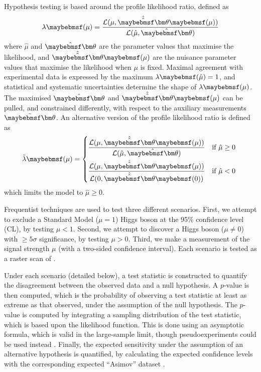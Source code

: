 Hypothesis testing is based around the profile likelihood ratio, defined as
\begin{equation}
	\lambda\parenths{\mu} = \frac{\mathcal{L}(\mu, \hat{\hat{\bvec{\theta}}}\parenths{\mu})}{\mathcal{L}(\hat{\mu}, \hat{\bvec{\theta}})}
\end{equation}
where $\hat{\mu}$ and $\hat{\bvec{\theta}}$ are the parameter values that maximise the 
likelihood, and $\hat{\hat{\bvec{\theta}}}\parenths{\mu}$ are the nuisance parameter values 
that maximise the likelihood when $\mu$ is fixed. Maximal agreement with experimental data 
is expressed by the maximum $\lambda\parenths{\hat{\mu}} = 1$, and statistical and 
systematic uncertainties determine the shape of $\lambda\parenths{\mu}$. The maximised 
$\hat{\bvec{\theta}}$ and $\hat{\hat{\bvec{\theta}}}\parenths{\mu}$ can be pulled, and 
constrained differently, with respect to the auxiliary measurements $\tilde{\bvec{\theta}}$. 
An alternative version of the profile likelihood ratio is defined as
\begin{equation}
	\tilde{\lambda}\parenths{\mu} = 
	\begin{dcases*}
		\frac{\mathcal{L}(\mu, \hat{\hat{\bvec{\theta}}}\parenths{\mu})}{\mathcal{L}(\hat{\mu}, \hat{\bvec{\theta}})} & if $\hat{\mu} \geq 0$ \\
		\frac{\mathcal{L}(\mu, \hat{\hat{\bvec{\theta}}}\parenths{\mu})}{\mathcal{L}(0, \hat{\hat{\bvec{\theta}}}\parenths{0})} & if $\hat{\mu} < 0$
	\end{dcases*}
\end{equation}
which limits the model to $\hat{\mu} \geq 0$.

Frequentist techniques are used to test three different scenarios. First, we attempt to 
exclude a Standard Model (\ie $\mu = 1$) Higgs boson at the 95\% confidence level (CL), by 
testing $\mu < 1$. Second, we attempt to discover a Higgs boson (\ie $\mu \neq 0$) with 
$\geq\!5\sigma$ significance, by testing $\mu > 0$. Third, we make a measurement of the 
signal strength $\mu$ (with a two-sided confidence interval). Each scenario is tested as 
a raster scan of \mH.

Under each scenario (detailed below), a test statistic is constructed to quantify the 
disagreement between the observed data and a null hypothesis. A $p$-value is then 
computed, which is the probability of observing a test statistic at least as extreme as that 
observed, under the assumption of the null hypothesis. The $p$-value is computed by 
integrating a sampling distribution of the test statistic, which is based upon the 
likelihood function. This is done using an asymptotic formula, which is valid in the 
large-sample limit, though pseudoexperiments could be used instead \cite{Cowan:2010}. 
Finally, the expected sensitivity under the assumption of an alternative hypothesis is 
quantified, by calculating the expected confidence levels with the corresponding expected 
``Asimov'' dataset \cite{Cowan:2010}.

